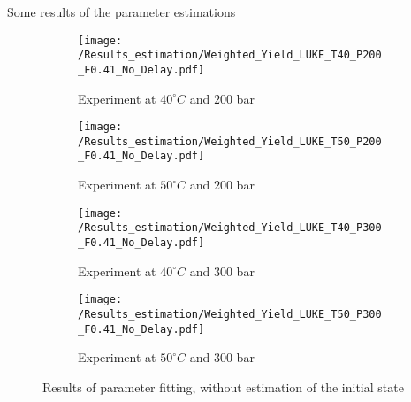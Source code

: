 \documentclass[../Article_Model_Parameters.tex]{subfiles}
\begin{document}
	
	\label{CH: Results}
	
	Some results of the parameter estimations

	\begin{figure*}
		\centering
		\begin{subfigure}[b]{0.7\textwidth}
			\centering
			\texttt{[image: /Results\_estimation/Weighted\_Yield\_LUKE\_T40\_P200\_F0.41\_No\_Delay.pdf]}
			\caption{Experiment at $40^\circ C$ and $200$ bar}
		\end{subfigure}
		\hfill
		\begin{subfigure}[b]{0.7\textwidth}
			\centering
			\texttt{[image: /Results\_estimation/Weighted\_Yield\_LUKE\_T50\_P200\_F0.41\_No\_Delay.pdf]}
			\caption{Experiment at $50^\circ C$ and $200$ bar}
		\end{subfigure}
		\hfill
		\begin{subfigure}[b]{0.7\textwidth}
			\centering
			\texttt{[image: /Results\_estimation/Weighted\_Yield\_LUKE\_T40\_P300\_F0.41\_No\_Delay.pdf]}
			\caption{Experiment at $40^\circ C$ and $300$ bar}
		\end{subfigure}
		\hfill
		\begin{subfigure}[b]{0.7\textwidth}
			\centering
			\texttt{[image: /Results\_estimation/Weighted\_Yield\_LUKE\_T50\_P300\_F0.41\_No\_Delay.pdf]}
			\caption{Experiment at $50^\circ C$ and $300$ bar}
		\end{subfigure}
		\caption{Results of parameter fitting, without estimation of the initial state}
	\end{figure*}
		
	
\end{document}
